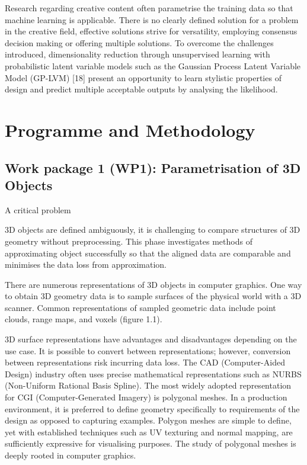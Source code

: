 \documentclass[a4paper, fontsize=15pt, onecolumn]{article} %
\numberwithin{equation}{section} %
\numberwithin{figure}{section} %
\numberwithin{table}{section} %
\begin{document}

Research regarding creative content often parametrise the training data so that machine learning is applicable. There is no clearly defined solution for a problem in the creative field, effective solutions strive for versatility, employing consensus decision making or offering multiple solutions. To overcome the challenges introduced, dimensionality reduction through unsupervised learning with probabilistic latent variable models such as the Gaussian Process Latent Variable Model (GP-LVM) [18] present an opportunity to learn stylistic properties of design and predict multiple acceptable outputs by analysing the likelihood.


\section{Programme and Methodology}
\subsection{Work package 1 (WP1): Parametrisation of 3D Objects}
A critical problem 

3D objects are defined ambiguously, it is challenging to compare structures of 3D geometry without preprocessing. This phase investigates methods of approximating object successfully so that the aligned data are comparable and minimises the data loss from approximation.

There are numerous representations of 3D objects in computer graphics. One way to obtain 3D geometry data is to sample surfaces of the physical world with a 3D scanner. Common representations of sampled geometric data include point clouds, range maps, and voxels (figure 1.1).

3D surface representations have advantages and disadvantages depending on the use case. It is possible to convert between representations; however, conversion between representations risk incurring data loss. The CAD (Computer-Aided Design) industry often uses precise mathematical representations such as NURBS (Non-Uniform Rational Basis Spline). The most widely adopted representation for CGI (Computer-Generated Imagery) is polygonal meshes. In a production environment, it is preferred to define geometry specifically to requirements of the design as opposed to capturing examples. Polygon meshes are simple to define, yet with established techniques such as UV texturing and normal mapping, are sufficiently expressive for visualising purposes. The study of polygonal meshes is deeply rooted in computer graphics.
\end{document}
